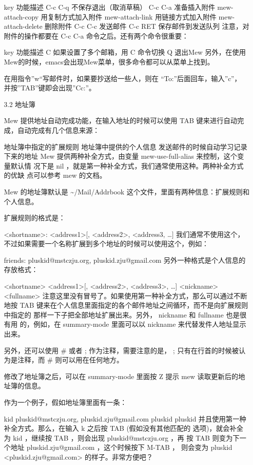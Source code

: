 \documentclass[11pt]{article}
\begin{document}
key     功能描述
C-c C-q 不保存退出（取消草稿）
C-c C-a 准备插入附件
mew-attach-copy 用复制方式加入附件
mew-attach-link 用链接方式加入附件
mew-attach-delete       删除附件
C-c C-c 发送邮件
C-c RET 保存邮件到发送队列
注意，对附件的操作都要在 C-c C-a 命令之后。还有两个命令很重要：

key     功能描述
C       如果设置了多个邮箱，用 C 命令切换
Q       退出Mew
另外，在使用Mew的时候，emacs会出现Mew菜单，很多命令都可以从菜单上找到。

在用指令”w“写邮件时，如果要抄送给一些人，则在 ``To:''后面回车，输入''c''， 并按''TAB''键即会出现''Cc:''。

3.2 地址簿

Mew 提供地址自动完成功能，在输入地址的时候可以使用 TAB 键来进行自动完成，自动完成有几个信息来源：

地址簿中指定的扩展规则
地址簿中提供的个人信息
发送邮件的时候自动学习记录下来的地址
Mew 提供两种补全方式，由变量 mew-use-full-alias 来控制，这个变量默认情 况下是 nil ，就是第一种补全方式，我们通常使用这种。两种补全方式的优缺 点可以参考 mew 的文档。

Mew 的地址簿默认是 \~{}/Mail/Addrbook 这个文件，里面有两种信息：扩展规则和个人信息。

扩展规则的格式是：

<shortname>: <address1>[, <address2>, <address3, \ldots{}]
我们通常不使用这个，不过如果需要一个名称扩展到多个地址的时候可以使用这个，例如：

friends: pluskid@mstczju.org, pluskid.zju@gmail.com
另外一种格式是个人信息的存放格式：

<shortname> <address1>[, <address2>, <address3>, \ldots{}] <nickname> <fullname>
注意这里没有冒号了。如果使用第一种补全方式，那么可以通过不断地按 TAB 键来在个人信息里面指定的各个邮件地址之间循环，而不是向扩展规则中指定的 那样一下子把全部地址扩展出来。另外， nickname 和 fullname 也是很有用 的，例如，在 summary-mode 里面可以以 nickname 来代替发件人地址显示出来。

另外，还可以使用 \# 或者 ; 作为注释，需要注意的是， ; 只有在行首的时候被认为是注释，而 \# 则可以用在任何地方。

修改了地址簿之后，可以在 summary-mode 里面按 Z 提示 mew 读取更新后的地址簿的信息。

作为一个例子，假如地址簿里面有一条：

kid pluskid@mstczju.org, pluskid.zju@gmail.com pluskid pluskid
并且使用第一种补全方式。那么，在输入 k 之后按 TAB (假如没有其他匹配的 选项)，就会补全为 kid ，继续按 TAB ，则会出现 pluskid@mstczju.org ，再 按 TAB 则变为下一个地址 pluskid.zju@gmail.com ，这个时候按下 M-TAB ， 则会变为 pluskid <pluskid.zju@gmail.com> 的样子。非常方便吧？
\end{document}
